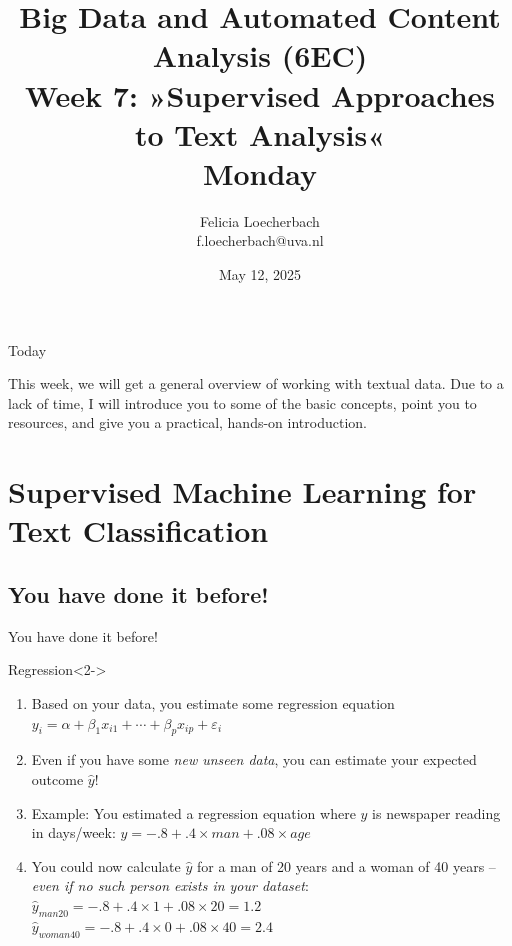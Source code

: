 \documentclass[compress]{beamer}
\begin{document}
\title[Big Data and Automated Content Analysis]{\textbf{Big Data and Automated Content Analysis (6EC)} 
\\Week 7: »Supervised Approaches to Text Analysis«
\\Monday}
\author[Felicia Loecherbach]{Felicia Loecherbach\\ \footnotesize{f.loecherbach@uva.nl \\}}
\date{May 12, 2025}


\begin{frame}{}
	\titlepage
\end{frame}

\begin{frame}{Today}
	\tableofcontents
\end{frame}



\begin{frame}[standout]
This week, we will get a general overview of working with textual data. Due to a lack of time, I will introduce you to some of the basic concepts, point you to resources, and give you a practical, hands-on introduction. 
\end{frame}


\section{Supervised Machine Learning for Text Classification}

\subsection{You have done it before!}
\begin{frame}{You have done it before!}
	\begin{block}{Regression}<2->
		\begin{enumerate}
			\item<3-> Based on your data, you estimate some regression equation 	$y_i = \alpha + \beta_1 x_{i1} + \cdots + \beta_p x_{ip} + \varepsilon_i$
			\item<4-> Even if you have some \emph{new unseen data}, you can estimate your expected outcome $\hat{y}$!
			\item<5-> Example: You estimated a regression equation where $y$ is newspaper reading in days/week: $y = -.8 + .4 \times man + .08 \times age$
			\item<6-> You could now calculate $\hat{y}$ for a man of 20 years and a woman of 40 years -- \emph{even if no such person exists in your dataset}: \\
			$\hat{y}_{man20} = -.8 + .4 \times 1 + .08 \times 20 = 1.2$ \\
			$\hat{y}_{woman40} = -.8 + .4 \times 0 + .08 \times 40 = 2.4$
		\end{enumerate}
	\end{block}	
	
\end{frame}
\end{document}
